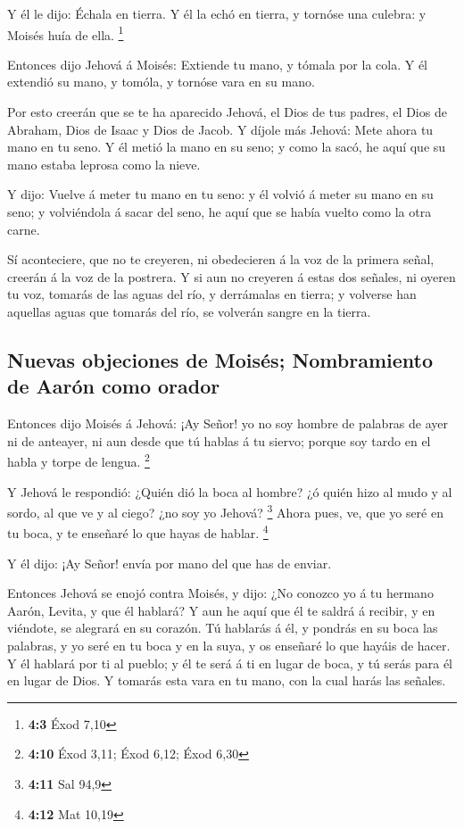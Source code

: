  Y él le dijo: Échala en tierra. Y él la echó en tierra, y
tornóse una culebra: y Moisés huía de ella. \footnote{\textbf{4:3} Éxod
  7,10}

 Entonces dijo Jehová á Moisés: Extiende tu mano, y tómala
por la cola. Y él extendió su mano, y tomóla, y tornóse vara en su mano.

 Por esto creerán que se te ha aparecido Jehová, el Dios
de tus padres, el Dios de Abraham, Dios de Isaac y Dios de Jacob.
 Y díjole más Jehová: Mete ahora tu mano en tu seno. Y él
metió la mano en su seno; y como la sacó, he aquí que su mano estaba
leprosa como la nieve.

 Y dijo: Vuelve á meter tu mano en tu seno: y él volvió á
meter su mano en su seno; y volviéndola á sacar del seno, he aquí que se
había vuelto como la otra carne.

 Sí aconteciere, que no te creyeren, ni obedecieren á la
voz de la primera señal, creerán á la voz de la postrera. 
Y si aun no creyeren á estas dos señales, ni oyeren tu voz, tomarás de
las aguas del río, y derrámalas en tierra; y volverse han aquellas aguas
que tomarás del río, se volverán sangre en la tierra.

\hypertarget{nuevas-objeciones-de-moisuxe9s-nombramiento-de-aaruxf3n-como-orador}{%
\subsection{Nuevas objeciones de Moisés; Nombramiento de Aarón como
orador}\label{nuevas-objeciones-de-moisuxe9s-nombramiento-de-aaruxf3n-como-orador}}

 Entonces dijo Moisés á Jehová: ¡Ay Señor! yo no soy
hombre de palabras de ayer ni de anteayer, ni aun desde que tú hablas á
tu siervo; porque soy tardo en el habla y torpe de lengua. \footnote{\textbf{4:10}
  Éxod 3,11; Éxod 6,12; Éxod 6,30}

 Y Jehová le respondió: ¿Quién dió la boca al hombre? ¿ó
quién hizo al mudo y al sordo, al que ve y al ciego? ¿no soy yo Jehová?
\footnote{\textbf{4:11} Sal 94,9}  Ahora pues, ve, que yo
seré en tu boca, y te enseñaré lo que hayas de hablar. \footnote{\textbf{4:12}
  Mat 10,19}

 Y él dijo: ¡Ay Señor! envía por mano del que has de
enviar.

 Entonces Jehová se enojó contra Moisés, y dijo: ¿No
conozco yo á tu hermano Aarón, Levita, y que él hablará? Y aun he aquí
que él te saldrá á recibir, y en viéndote, se alegrará en su corazón.
 Tú hablarás á él, y pondrás en su boca las palabras, y
yo seré en tu boca y en la suya, y os enseñaré lo que hayáis de hacer.
 Y él hablará por ti al pueblo; y él te será á ti en
lugar de boca, y tú serás para él en lugar de Dios.  Y
tomarás esta vara en tu mano, con la cual harás las señales.

